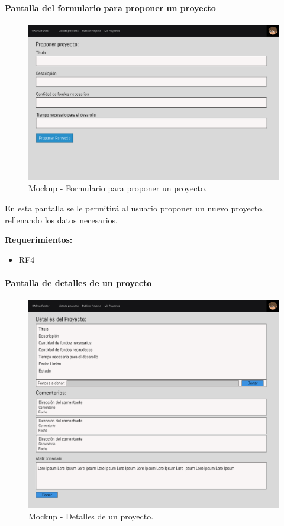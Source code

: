 \paragraph{Pantalla del formulario para proponer un proyecto}
\begin{figure}[H]
        \centering
        \includegraphics[width=1\textwidth]{img/mockups/proponer_proyecto.png}
        \caption{Mockup - Formulario para proponer un proyecto.}
        \label{fig:configApi}
\end{figure}

En esta pantalla se le permitirá al usuario proponer un nuevo proyecto, rellenando los datos necesarios.

\bigskip

\textbf{Requerimientos: }
\begin{itemize}
    \item RF4
\end{itemize}

\paragraph{Pantalla de detalles de un proyecto}
\begin{figure}[H]
        \centering
        \includegraphics[width=1\textwidth]{img/mockups/detalles_proyecto.png}
        \caption{Mockup - Detalles de un proyecto.}
        \label{fig:configApi}
\end{figure}

